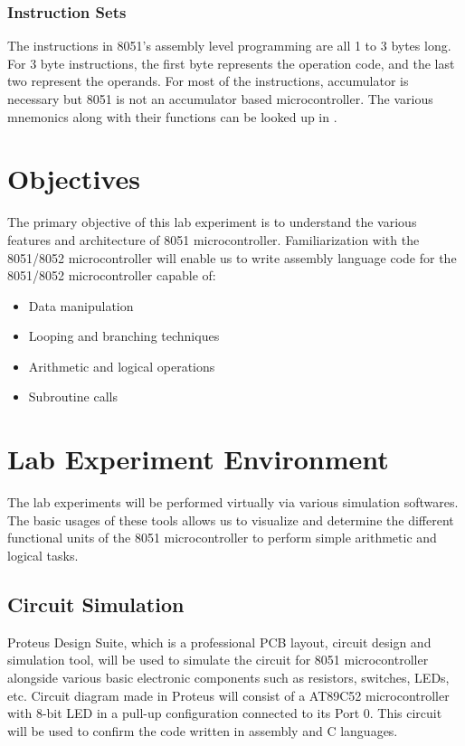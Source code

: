 \documentclass{lab_sheet}
\begin{document}
\subsubsection{Instruction Sets}
The instructions in 8051's assembly level programming are all 1 to 3 bytes long. For 3 byte instructions, the first byte represents the operation code, and the last two represent the operands. For most of the instructions, accumulator is necessary but 8051 is not an accumulator based microcontroller. The various mnemonics along with their functions can be looked up in \cite{instruction}.
\section{Objectives}
The primary objective of this lab experiment is to understand the various features and architecture of 8051 microcontroller. Familiarization with the 8051/8052 microcontroller will enable us to write assembly language code for the 8051/8052 microcontroller capable of:
\begin{itemize}
\item Data manipulation
\item Looping and branching techniques
\item Arithmetic and logical operations
\item Subroutine calls
\end{itemize}
\section{Lab Experiment Environment}
The lab experiments will be performed virtually via various simulation softwares. 
The basic usages of these tools allows us to visualize and determine the different 
functional units of the 8051 microcontroller to perform simple arithmetic and logical tasks.
\subsection{Circuit Simulation}
Proteus Design Suite, which is a professional PCB layout, circuit design and simulation tool,
 will be used to simulate the circuit for 8051 microcontroller alongside
  various basic electronic components such as resistors, switches, LEDs, etc. Circuit diagram made in Proteus will consist of a AT89C52 microcontroller with 8-bit LED in a pull-up configuration connected to its Port 0. This circuit will be used to confirm the code written in assembly and C languages.
\end{document}
